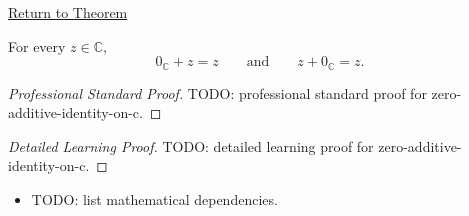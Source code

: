 \newpage
{}
\label{prf:zero-additive-identity-on-c}

\begin{remark*}[Return]
\hyperref[thm:zero-additive-identity-on-c]{Return to Theorem}
\end{remark*}

\begin{theorem*}
For every \(z\in\mathbb{C}\),
\[
0_{\mathbb{C}}+z=z
\qquad\text{and}\qquad
z+0_{\mathbb{C}}=z.
\]
\end{theorem*}

\begin{proof}[Professional Standard Proof]
\LRAProofBodyStart
TODO: professional standard proof for zero-additive-identity-on-c.
\end{proof}

\begin{proof}[Detailed Learning Proof]
\LRAProofBodyStart
TODO: detailed learning proof for zero-additive-identity-on-c.
\end{proof}

\begin{remark*}
\end{remark*}

\begin{dependencies}
\begin{itemize}
  \item TODO: list mathematical dependencies.
\end{itemize}
\end{dependencies}

\clearpage
